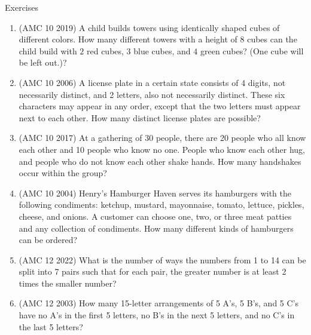 \begin{xcb}{Exercises}
\begin{enumerate}
\item(AMC 10 2019)  A child builds towers using identically shaped cubes of different colors. How many different towers with a height of $8$ cubes can the child build with $2$ red cubes, $3$ blue cubes, and $4$ green cubes? (One cube will be left out.)?
\begin{hint}
\end{hint}
\item (AMC 10 2006)  A license plate in a certain state consists of 4 digits, not necessarily distinct, and 2 letters, also not necessarily distinct. These six characters may appear in any order, except that the two letters must appear next to each other. How many distinct license plates are possible?
\begin{hint}
\end{hint}
\item (AMC 10 2017)  At a gathering of 30 people, there are 20 people who all know each other and 10 people who know no one. People who know each other hug, and people who do not know each other shake hands. How many handshakes occur within the group?
\item (AMC 10 2004)  Henry’s Hamburger Haven serves its hamburgers with the following condiments: ketchup, mustard, mayonnaise, tomato, lettuce, pickles, cheese, and onions. A customer can choose one, two, or three meat patties and any collection of condiments. How many different kinds of hamburgers can be ordered?
\item (AMC 12 2022)  What is the number of ways the numbers from 1 to 14 can be split into 7 pairs such that for each pair, the greater number is at least 2 times the smaller number?
\begin{hint}
\end{hint}
\item(AMC 12 2003)  How many 15-letter arrangements of 5 A’s, 5 B’s, and 5 C’s have no A’s in the first 5 letters, no B’s in the next 5 letters, and no C’s in the last 5 letters?
\begin{hint}

\end{hint}
\end{enumerate}
\end{xcb}
